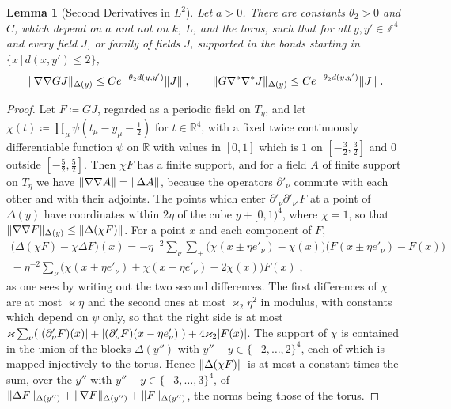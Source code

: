 \documentclass[11pt]{preprint}
\DeclarePairedDelimiter{\abs}{\lvert}{\rvert}
\DeclarePairedDelimiter{\norm}{\lVert}{\rVert}
\numberwithin{equation}{section}
\newtheorem{lemma}[theorem]{Lemma}
\theoremstyle{definition}
\theoremstyle{remark}
\theoremstyle{plain}
\begin{document}
\begin{lemma}[Second Derivatives in $L^2$]\label{lem:l2-second}
Let $a > 0$. There are constants $\theta_2 > 0$ and $C$, which depend on $a$ and not on $k$, $L$, and the torus, such that for all $y, y' \in \mathbb Z^4$ and every field $J$, or family of fields $J$, supported in the bonds starting in $\{ x \, | \, d(x, y') \leq 2 \}$,
\begin{equation}\label{eq:l2-second}
    \norm{\nabla\nabla GJ}_{\Delta(y)} \leq Ce^{-\theta_2d(y, y')}\norm{J}\;,
    \qquad
    \norm{G\nabla^*\nabla^*J}_{\Delta(y)} \leq Ce^{-\theta_2d(y, y')}\norm{J}\;.
\end{equation}
\end{lemma}

\begin{proof}
Let $F \coloneqq GJ$, regarded as a periodic field on $T_\eta$, and let $\chi(t) \coloneqq \prod_\mu\psi(t_\mu - y_\mu - \frac12)$ for $t \in \mathbb R^4$, with a fixed twice continuously differentiable function $\psi$ on $\mathbb R$ with values in $[0, 1]$ which is $1$ on $[-\frac32, \frac32]$ and $0$ outside $[-\frac52, \frac52]$. Then $\chi F$ has a finite support, and for a field $A$ of finite support on $T_\eta$ we have $\norm{\nabla\nabla A} = \norm{\Delta A}$, because the operators $\partial'_\nu$ commute with each other and with their adjoints. The points which enter $\partial'_\nu\partial'_{\nu'}F$ at a point of $\Delta(y)$ have coordinates within $2\eta$ of the cube $y + [0, 1)^4$, where $\chi = 1$, so that $\norm{\nabla\nabla F}_{\Delta(y)} \leq \norm{\Delta(\chi F)}$. For a point $x$ and each component of $F$,
\begin{equation}\label{eq:leibniz}
\begin{split}
    \bigl(\Delta(\chi F) - \chi\Delta F\bigr)(x) = -\eta^{-2}\sum_\nu\sum_{\pm}\bigl(\chi(x \pm \eta e'_\nu) - \chi(x)\bigr)\bigl(F(x \pm \eta e'_\nu) - F(x)\bigr)\\
    {} - \eta^{-2}\sum_\nu\bigl(\chi(x + \eta e'_\nu) + \chi(x - \eta e'_\nu) - 2\chi(x)\bigr)F(x)\;,
\end{split}
\end{equation}
as one sees by writing out the two second differences. The first differences of $\chi$ are at most $\varkappa\eta$ and the second ones at most $\varkappa_2\eta^2$ in modulus, with constants which depend on $\psi$ only, so that the right side is at most $\varkappa\sum_\nu(\abs{(\partial'_\nu F)(x)} + \abs{(\partial'_\nu F)(x - \eta e'_\nu)}) + 4\varkappa_2\abs{F(x)}$. The support of $\chi$ is contained in the union of the blocks $\Delta(y'')$ with $y'' - y \in \{ -2, \dots, 2 \}^4$, each of which is mapped injectively to the torus. Hence $\norm{\Delta(\chi F)}$ is at most a constant times the sum, over the $y''$ with $y'' - y \in \{ -3, \dots, 3 \}^4$, of $\norm{\Delta F}_{\Delta(y'')} + \norm{\nabla F}_{\Delta(y'')} + \norm{F}_{\Delta(y'')}$, the norms being those of the torus.


\end{proof}
\end{document}
